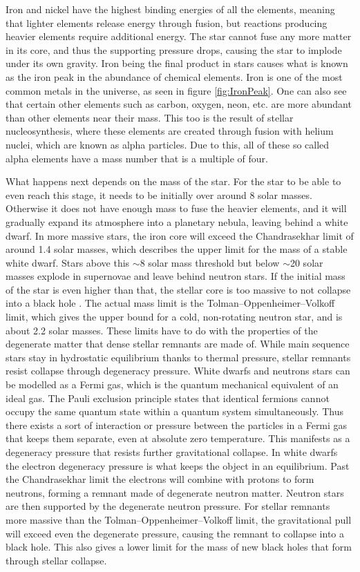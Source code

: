 \documentclass[english, oneside]{HYgradu}
\begin{document}
Iron and nickel have the highest binding energies of all the elements, meaning that lighter elements release energy through fusion, but reactions producing heavier elements require additional energy. The star cannot fuse any more matter in its core, and thus the supporting pressure drops, causing the star to implode under its own gravity. Iron being the final product in stars causes what is known as the iron peak in the abundance of chemical elements. Iron is one of the most common metals in the universe, as seen in figure \ref{fig:IronPeak}. One can also see that certain other elements such as carbon, oxygen, neon, etc. are more abundant than other elements near their mass. This too is the result of stellar nucleosynthesis, where these elements are created through fusion with helium nuclei, which are known as alpha particles. Due to this, all of these so called alpha elements have a mass number that is a multiple of four.

What happens next depends on the mass of the star. For the star to be able to even reach this stage, it needs to be initially over around 8 solar masses. Otherwise it does not have enough mass to fuse the heavier elements, and it will gradually expand its atmosphere into a planetary nebula, leaving behind a white dwarf. In more massive stars, the iron core will exceed the Chandrasekhar limit of around 1.4 solar masses, which describes the upper limit for the mass of a stable white dwarf. Stars above this $\sim$8 solar mass threshold but below $\sim$20 solar masses explode in supernovae and leave behind neutron stars. If the initial mass of the star is even higher than that, the stellar core is too massive to not collapse into a black hole \citep{woosley:2002}. The actual mass limit is the Tolman–Oppenheimer–Volkoff limit, which gives the upper bound for a cold, non-rotating neutron star, and is about 2.2 solar masses. These limits have to do with the properties of the degenerate matter that dense stellar remnants are made of. While main sequence stars stay in hydrostatic equilibrium thanks to thermal pressure, stellar remnants resist collapse through degeneracy pressure. White dwarfs and neutrons stars can be modelled as a Fermi gas, which is the quantum mechanical equivalent of an ideal gas. The Pauli exclusion principle states that identical fermions cannot occupy the same quantum state within a quantum system simultaneously. Thus there exists a sort of interaction or pressure between the particles in a Fermi gas that keeps them separate, even at absolute zero temperature. This manifests as a degeneracy pressure that resists further gravitational collapse. In white dwarfs the electron degeneracy pressure is what keeps the object in an equilibrium. Past the Chandrasekhar limit the electrons will combine with protons to form neutrons, forming a remnant made of degenerate neutron matter. Neutron stars are then supported by the degenerate neutron pressure. For stellar remnants more massive than the Tolman–Oppenheimer–Volkoff limit, the gravitational pull will exceed even the degenerate pressure, causing the remnant to collapse into a black hole. This also gives a lower limit for the mass of new black holes that form through stellar collapse.
\end{document}
